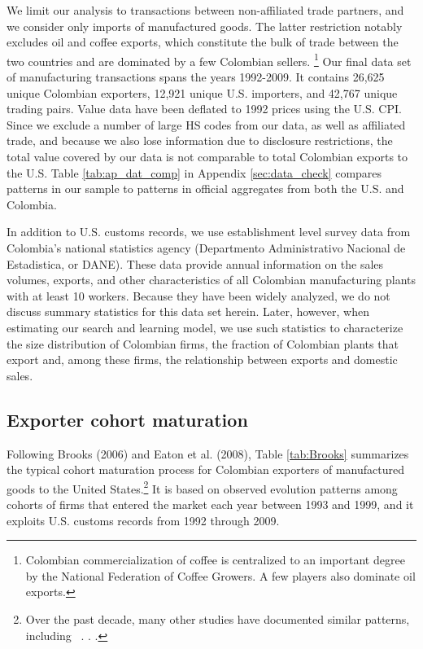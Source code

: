 \documentclass[12pt]{article}
\begin{document}
We limit our analysis to transactions between non-affiliated trade partners,
and we consider only imports of manufactured goods. The latter restriction
notably excludes oil and coffee exports, which constitute the bulk of trade
between the two countries and are dominated by a few Colombian sellers.%
\footnote{%
Colombian commercialization of coffee is centralized to an important degree
by the National Federation of Coffee Growers. A few players also dominate
oil exports.} Our final data set of manufacturing transactions spans the
years 1992-2009. It contains 26,625 unique Colombian exporters, 12,921
unique U.S. importers, and 42,767 unique trading pairs. Value data have been
deflated to 1992 prices using the U.S. CPI. Since we exclude a number of
large HS codes from our data, as well as affiliated trade, and because we
also lose information due to disclosure restrictions, the total value
covered by our data is not comparable to total Colombian exports to the U.S.
Table \ref{tab:ap_dat_comp} in Appendix \ref{sec:data_check} compares
patterns in our sample to patterns in official aggregates from both the U.S.
and Colombia.

In addition to U.S. customs records, we use establishment level survey data
from Colombia's national statistics agency (Departmento Administrativo
Nacional de Estadistica, or DANE). These data provide annual information on
the sales volumes, exports, and other characteristics of all Colombian
manufacturing plants with at least 10 workers. Because they have been widely
analyzed, we do not discuss summary statistics for this data set herein.
Later, however, when estimating our search and learning model, we use such
statistics to characterize the size distribution of Colombian firms, the
fraction of Colombian plants that export and, among these firms, the
relationship between exports and domestic sales.

\subsection{Exporter cohort maturation}

Following Brooks (2006) and Eaton et al. (2008), Table \ref{tab:Brooks}
summarizes the typical cohort maturation process for Colombian exporters of
manufactured goods to the United States.\footnote{%
Over the past decade, many other studies have documented similar patterns,
including \ . . .} It is based on observed evolution patterns among cohorts
of firms that entered the market each year between 1993 and 1999, and it
exploits U.S. customs records from 1992 through 2009.
\end{document}

